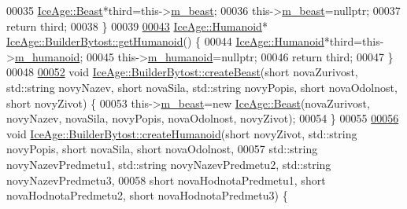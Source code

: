 \begin{DoxyCode}
00035     \hyperlink{classIceAge_1_1Beast}{IceAge::Beast}*third=this->\hyperlink{classIceAge_1_1BuilderBytost_a220df66c99fac9d382f5d1825f5295de}{m\_beast};
00036     this->\hyperlink{classIceAge_1_1BuilderBytost_a220df66c99fac9d382f5d1825f5295de}{m\_beast}=\textcolor{keyword}{nullptr};
00037     \textcolor{keywordflow}{return} third;
00038 \}
00039 
\hypertarget{BuilderBytost_8cpp_source.tex_l00043}{}\hyperlink{classIceAge_1_1BuilderBytost_a41d069e42ccad24d1af34e3e30945e25}{00043} \hyperlink{classIceAge_1_1Humanoid}{IceAge::Humanoid}* \hyperlink{classIceAge_1_1BuilderBytost_a41d069e42ccad24d1af34e3e30945e25}{IceAge::BuilderBytost::getHumanoid}() \{
00044     \hyperlink{classIceAge_1_1Humanoid}{IceAge::Humanoid}*third=this->\hyperlink{classIceAge_1_1BuilderBytost_a3f4076d50f5bf435c3a90fc123d807a2}{m\_humanoid};
00045     this->\hyperlink{classIceAge_1_1BuilderBytost_a3f4076d50f5bf435c3a90fc123d807a2}{m\_humanoid}=\textcolor{keyword}{nullptr};
00046     \textcolor{keywordflow}{return} third;
00047 \}
00048 
\hypertarget{BuilderBytost_8cpp_source.tex_l00052}{}\hyperlink{classIceAge_1_1BuilderBytost_a090e775261513f873b1aa85dcaca5efb}{00052} \textcolor{keywordtype}{void} \hyperlink{classIceAge_1_1BuilderBytost_a090e775261513f873b1aa85dcaca5efb}{IceAge::BuilderBytost::createBeast}(\textcolor{keywordtype}{short} novaZurivost, std::string 
      novyNazev, \textcolor{keywordtype}{short} novaSila, std::string novyPopis, \textcolor{keywordtype}{short} novaOdolnost, \textcolor{keywordtype}{short} novyZivot) \{
00053     this->\hyperlink{classIceAge_1_1BuilderBytost_a220df66c99fac9d382f5d1825f5295de}{m\_beast}=\textcolor{keyword}{new} \hyperlink{classIceAge_1_1Beast}{IceAge::Beast}(novaZurivost, novyNazev, novaSila, novyPopis, 
      novaOdolnost, novyZivot);
00054 \}
00055 
\hypertarget{BuilderBytost_8cpp_source.tex_l00056}{}\hyperlink{classIceAge_1_1BuilderBytost_ad0ec5281ef8ba796b945845913802b32}{00056} \textcolor{keywordtype}{void} \hyperlink{classIceAge_1_1BuilderBytost_ad0ec5281ef8ba796b945845913802b32}{IceAge::BuilderBytost::createHumanoid}(\textcolor{keywordtype}{short} novyZivot, 
      std::string novyPopis, \textcolor{keywordtype}{short} novaSila, \textcolor{keywordtype}{short} novaOdolnost,
00057                                             std::string novyNazevPredmetu1, std::string novyNazevPredmetu2,
       std::string novyNazevPredmetu3,
00058                                             \textcolor{keywordtype}{short} novaHodnotaPredmetu1, \textcolor{keywordtype}{short} novaHodnotaPredmetu2, \textcolor{keywordtype}{short} 
      novaHodnotaPredmetu3) \{

\end{DoxyCode}

